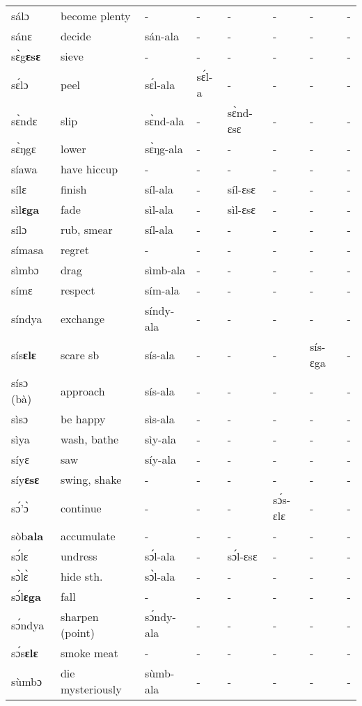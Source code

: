 \begin{sidewaystable}
\begin{longtable}{lp{3.5cm}llllll}
sálɔ & become plenty & - & - & -  & - & -  & -\\
sánɛ & decide & sán-ala & -  & - & -  & - & - \\
sɛ̀g{\bfseries ɛsɛ} & sieve & - & - & - & - & - & - \\
sɛ́lɔ & peel & sɛ́l-ala & sɛ́l-a & - & - & - & - \\
sɛ̀ndɛ & slip & sɛ̀nd-ala & - & sɛ̀nd-ɛsɛ & - &  - & - \\
sɛ̀ŋgɛ & lower & sɛ̀ŋg-ala & - & - & - & - & - \\
síawa & have hiccup & - & - & - & - & - & - \\
sílɛ & finish & síl-ala & - & síl-ɛsɛ  & - &  - & - \\
sìl{\bfseries ɛga} & fade & sìl-ala & - & sìl-ɛsɛ & - &  - & - \\
sílɔ & rub, smear & síl-ala & - & - & -  & - & - \\
símasa & regret & -  & - & - & - & - & - \\
sìmbɔ & drag & sìmb-ala & - & - & -  & - &  - \\
símɛ & respect & sím-ala & - & - &  - & - &  -  \\
síndya & exchange & síndy-ala & - & - &  - & - &  - \\
sís{\bfseries ɛlɛ} & scare sb & sís-ala & - & - &  -  & sís-ɛga & - \\
sísɔ (bà) & approach & sís-ala & - & - & - & - &  -  \\
sìsɔ & be happy & sìs-ala & - & - & - & - & - \\
sìya & wash, bathe & sìy-ala & - & - & -  & - & - \\
síyɛ &  saw & síy-ala & - & - & - & - & - \\
síy{\bfseries ɛsɛ}  & swing, shake & - & - &  - &  - & - & - \\
sɔ́'ɔ̀ & continue & - & - & - & sɔ́s-ɛlɛ & -  & - \\
sòb{\bfseries ala} & accumulate & - & - &  - & - & - & - \\
sɔ́lɛ & undress & sɔ́l-ala & - & sɔ́l-ɛsɛ & - & - & - \\
sɔ̀lɛ̀ & hide sth. & sɔ̀l-ala & - & - & - &  - & - \\
sɔ́l{\bfseries ɛga} & fall & - & - & - &  - & - & - \\
sɔ́ndya & sharpen (point) & sɔ́ndy-ala & - & - & - & - &  - \\
sɔ́s{\bfseries ɛlɛ} & smoke meat & - & - & - & - & - & - \\
sùmbɔ & die mysteriously & sùmb-ala & - & - & - & - & - \\

\end{longtable}
\end{sidewaystable}
